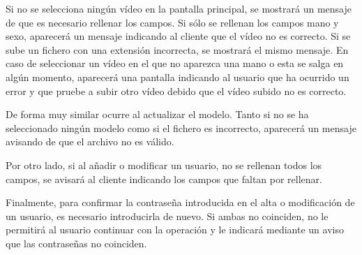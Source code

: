 Si no se selecciona ningún vídeo en la pantalla principal, se mostrará un mensaje de que es necesario rellenar los campos. Si sólo se rellenan los campos mano y sexo, aparecerá un mensaje indicando al cliente que el vídeo no es correcto. Si se sube un fichero con una extensión incorrecta, se mostrará el mismo mensaje. En caso de seleccionar un vídeo en el que no aparezca una mano o esta se salga en algún momento, aparecerá una pantalla indicando al usuario que ha ocurrido un error y que pruebe a subir otro vídeo debido que el vídeo subido no es correcto.

De forma muy similar ocurre al actualizar el modelo. Tanto si no se ha seleccionado ningún modelo como si el fichero es incorrecto, aparecerá un mensaje avisando de que el archivo no es válido.

Por otro lado, si al añadir o modificar un usuario, no se rellenan todos los campos, se avisará al cliente indicando los campos que faltan por rellenar.

Finalmente, para confirmar la contraseña introducida en el alta o modificación de un usuario, es necesario introducirla de nuevo. Si ambas no coinciden, no le permitirá al usuario continuar con la operación y le indicará mediante un aviso que las contraseñas no coinciden.
